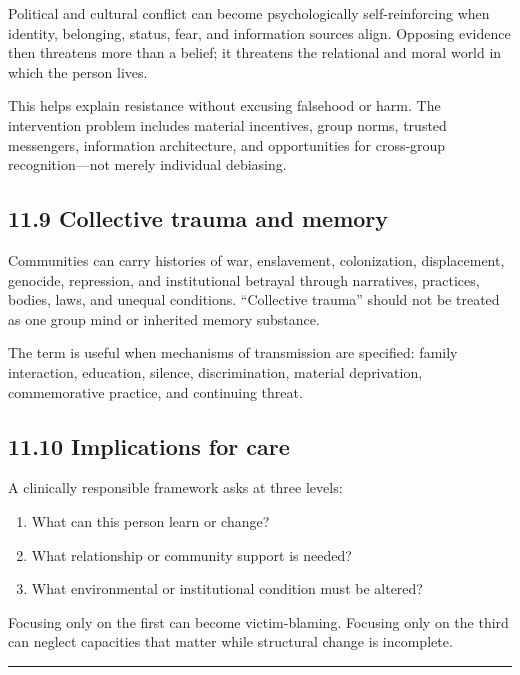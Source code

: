 \documentclass[
  11pt,
]{article}
\providecommand{\tightlist}{%
  \setlength{\itemsep}{0pt}\setlength{\parskip}{0pt}}
\begin{document}
Political and cultural conflict can become psychologically
self-reinforcing when identity, belonging, status, fear, and information
sources align. Opposing evidence then threatens more than a belief; it
threatens the relational and moral world in which the person lives.

This helps explain resistance without excusing falsehood or harm. The
intervention problem includes material incentives, group norms, trusted
messengers, information architecture, and opportunities for cross-group
recognition---not merely individual debiasing.

\subsection{11.9 Collective trauma and
memory}\label{collective-trauma-and-memory}

Communities can carry histories of war, enslavement, colonization,
displacement, genocide, repression, and institutional betrayal through
narratives, practices, bodies, laws, and unequal conditions.
``Collective trauma'' should not be treated as one group mind or
inherited memory substance.

The term is useful when mechanisms of transmission are specified: family
interaction, education, silence, discrimination, material deprivation,
commemorative practice, and continuing threat.

\subsection{11.10 Implications for care}\label{implications-for-care}

A clinically responsible framework asks at three levels:

\begin{enumerate}
\def\labelenumi{\arabic{enumi}.}
\tightlist
\item
  What can this person learn or change?
\item
  What relationship or community support is needed?
\item
  What environmental or institutional condition must be altered?
\end{enumerate}

Focusing only on the first can become victim-blaming. Focusing only on
the third can neglect capacities that matter while structural change is
incomplete.

\begin{center}\rule{0.5\linewidth}{0.5pt}\end{center}
\end{document}
